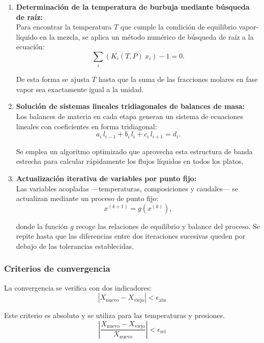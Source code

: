 \begin{enumerate}
      \item \textbf{Determinación de la temperatura de burbuja mediante búsqueda de raíz:}\\
            Para encontrar la temperatura $T$ que cumple la condición de equilibrio vapor-líquido en la mezcla, se aplica un método numérico de búsqueda de raíz a la ecuación:
            $$
                  \sum_i \left( K_i(T,P)\ x_i \right) - 1 = 0.
            $$

            De esta forma se ajusta $T$ hasta que la suma de las fracciones molares en fase vapor sea exactamente igual a la unidad.

      \item \textbf{Solución de sistemas lineales tridiagonales de balances de masa:}\\
            Los balances de materia en cada etapa generan un sistema de ecuaciones lineales con coeficientes en forma tridiagonal:
            $$
                  a_i\,l_{i-1} + b_i\,l_i + c_i\,l_{i+1} = d_i.
            $$

            Se emplea un algoritmo optimizado que aprovecha esta estructura de banda estrecha para calcular rápidamente los flujos líquidos en todos los platos.

      \item \textbf{Actualización iterativa de variables por punto fijo:}\\
            Las variables acopladas —temperaturas, composiciones y caudales— se actualizan mediante un proceso de punto fijo:
            $$
                  x^{(k+1)} = g\left( x^{(k)} \right),
            $$

            donde la función $g$ recoge las relaciones de equilibrio y balance del proceso. Se repite hasta que las diferencias entre dos iteraciones sucesivas queden por debajo de las tolerancias establecidas.
\end{enumerate}

\subsubsection{Criterios de convergencia}
La convergencia se verifica con dos indicadores:
$$
      |X_{\mathrm{nuevo}} - X_{\mathrm{viejo}}| < \epsilon_{\mathrm{abs}}
$$

Este criterio es absoluto y se utiliza para las temperaturas y presiones.
$$
      \left| \frac{X_{\mathrm{nuevo}} - X_{\mathrm{viejo}}}{X_{\mathrm{nuevo}}} \right| < \epsilon_{\mathrm{rel}}
$$

